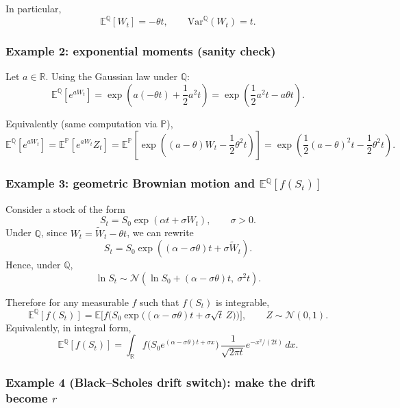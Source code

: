 \documentclass[11pt]{article}
\theoremstyle{definition}
\theoremstyle{remark}
\newcommand{\Pbb}{\mathbb{P}}
\newcommand{\Qbb}{\mathbb{Q}}
\newcommand{\E}{\mathbb{E}}
\newcommand{\R}{\mathbb{R}}
\newcommand{\1}{\mathbf{1}}
\theoremstyle{definition}
\begin{document}
In particular,
\[
\E^\Qbb[W_t]=-\theta t,\qquad \text{Var}^\Qbb(W_t)=t.
\]

\subsubsection*{Example 2: exponential moments (sanity check)}

Let $a\in\R$. Using the Gaussian law under $\Qbb$:
\[
\E^\Qbb\!\left[e^{aW_t}\right]
=
\exp\!\left(a(-\theta t)+\frac12 a^2 t\right)
=
\exp\!\left(\frac12 a^2 t-a\theta t\right).
\]

Equivalently (same computation via $\Pbb$),
\[
\E^\Qbb\!\left[e^{aW_t}\right]
=
\E^\Pbb\!\left[e^{aW_t}Z_t\right]
=
\E^\Pbb\!\left[\exp\!\left((a-\theta)W_t-\frac12\theta^2 t\right)\right]
=
\exp\!\left(\frac12(a-\theta)^2 t-\frac12\theta^2 t\right).
\]

\subsubsection*{Example 3: geometric Brownian motion and $\E^\Qbb[f(S_t)]$}

Consider a stock of the form
\[
S_t = S_0\exp\!\left(\alpha t+\sigma W_t\right),
\qquad \sigma>0.
\]
Under $\Qbb$, since $W_t=\widetilde W_t-\theta t$, we can rewrite
\[
S_t
=
S_0\exp\!\left((\alpha-\sigma\theta)t+\sigma \widetilde W_t\right).
\]
Hence, under $\Qbb$,
\[
\ln S_t \sim \mathcal N\!\left(\ln S_0+(\alpha-\sigma\theta)t,\ \sigma^2 t\right).
\]

Therefore for any measurable $f$ such that $f(S_t)$ is integrable,
\[
\boxed{
\;
\E^\Qbb[f(S_t)]
=
\E\Big[f\!\Big(S_0\exp\!\big((\alpha-\sigma\theta)t+\sigma\sqrt{t}\,Z\big)\Big)\Big],
\qquad Z\sim\mathcal N(0,1).
\;}
\]
Equivalently, in integral form,
\[
\E^\Qbb[f(S_t)]
=
\int_{\R} f\!\Big(S_0 e^{(\alpha-\sigma\theta)t+\sigma x}\Big)\,
\frac{1}{\sqrt{2\pi t}}e^{-x^2/(2t)}\,dx.
\]

\subsubsection*{Example 4 (Black--Scholes drift switch): make the drift become $r$}
\end{document}
